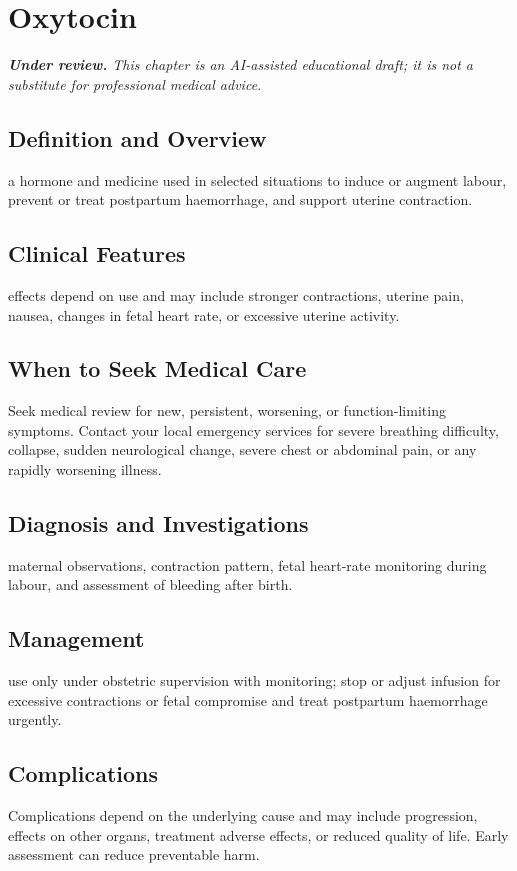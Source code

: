 \chapter{Oxytocin}

\medskip
\noindent\textit{\textbf{Under review.} This chapter is an AI-assisted educational draft; it is not a substitute for professional medical advice.}

\section*{Definition and Overview}
a hormone and medicine used in selected situations to induce or augment labour, prevent or treat postpartum haemorrhage, and support uterine contraction.

\section*{Clinical Features}
effects depend on use and may include stronger contractions, uterine pain, nausea, changes in fetal heart rate, or excessive uterine activity.

\section*{When to Seek Medical Care}
Seek medical review for new, persistent, worsening, or function-limiting symptoms. Contact your local emergency services for severe breathing difficulty, collapse, sudden neurological change, severe chest or abdominal pain, or any rapidly worsening illness.

\section*{Diagnosis and Investigations}
maternal observations, contraction pattern, fetal heart-rate monitoring during labour, and assessment of bleeding after birth.

\section*{Management}
use only under obstetric supervision with monitoring; stop or adjust infusion for excessive contractions or fetal compromise and treat postpartum haemorrhage urgently.

\section*{Complications}
Complications depend on the underlying cause and may include progression, effects on other organs, treatment adverse effects, or reduced quality of life. Early assessment can reduce preventable harm.

